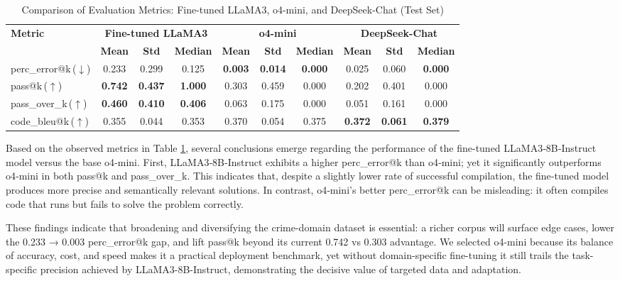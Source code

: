\begin{table}[H]
\centering
\caption{Comparison of Evaluation Metrics: Fine-tuned LLaMA3, o4-mini, and DeepSeek-Chat (Test Set)}
\label{tab:combined_metrics}
\setlength{\tabcolsep}{3.5pt}
\small
\begin{tabular}{l|ccc|ccc|ccc}
\toprule
\textbf{Metric} & \multicolumn{3}{c|}{\textbf{Fine-tuned LLaMA3}} & \multicolumn{3}{c|}{\textbf{o4-mini}} & \multicolumn{3}{c}{\textbf{DeepSeek-Chat}} \\
\cmidrule(lr){2-4} \cmidrule(lr){5-7} \cmidrule(lr){8-10}
 & \textbf{Mean} & \textbf{Std} & \textbf{Median} & \textbf{Mean} & \textbf{Std} & \textbf{Median} & \textbf{Mean} & \textbf{Std} & \textbf{Median} \\
\midrule
perc\_error@k\,($\downarrow$)  & 0.233 & 0.299 & 0.125 & \textbf{0.003} & \textbf{0.014} & \textbf{0.000} & 0.025 & 0.060 & \textbf{0.000} \\
pass@k\,($\uparrow$)           & \textbf{0.742} & \textbf{0.437} & \textbf{1.000} & 0.303 & 0.459 & 0.000 & 0.202 & 0.401 & 0.000 \\
pass\_over\_k\,($\uparrow$)     & \textbf{0.460} & \textbf{0.410} & \textbf{0.406} & 0.063 & 0.175 & 0.000 & 0.051 & 0.161 & 0.000 \\
code\_bleu@k\,($\uparrow$)     & 0.355 & 0.044 & 0.353 & 0.370 & 0.054 & 0.375 & \textbf{0.372} & \textbf{0.061} & \textbf{0.379} \\
\bottomrule
\end{tabular}
\end{table}

Based on the observed metrics in Table \ref{tab:combined_metrics}, several conclusions emerge regarding the performance of the fine-tuned LLaMA3‑8B‑Instruct model versus the base o4‑mini. First, LLaMA3‑8B‑Instruct exhibits a higher perc\_error@k than o4‑mini; yet it significantly outperforms o4‑mini in both pass@k and pass\_over\_k. This indicates that, despite a slightly lower rate of successful compilation, the fine‑tuned model produces more precise and semantically relevant solutions. In contrast, o4‑mini's better perc\_error@k can be misleading: it often compiles code that runs but fails to solve the problem correctly.

These findings indicate that broadening and diversifying the crime-domain dataset is essential: a richer corpus will surface edge cases, lower the 0.233 → 0.003 perc\_error@k gap, and lift pass@k beyond its current 0.742 vs 0.303 advantage. We selected o4-mini because its balance of accuracy, cost, and speed makes it a practical deployment benchmark, yet without domain-specific fine-tuning it still trails the task-specific precision achieved by LLaMA3-8B-Instruct, demonstrating the decisive value of targeted data and adaptation.

